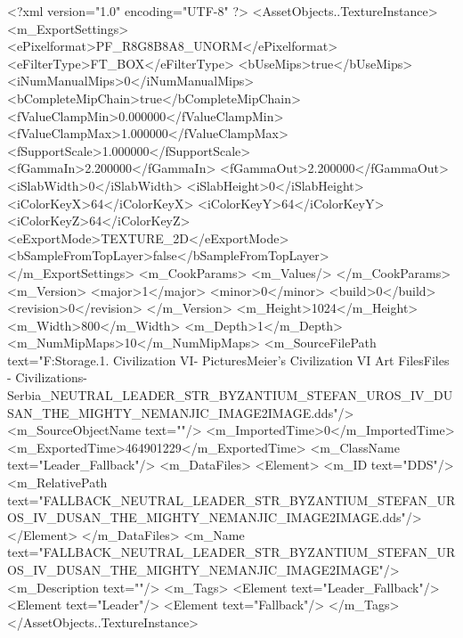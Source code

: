 <?xml version="1.0" encoding="UTF-8" ?>
<AssetObjects..TextureInstance>
	<m_ExportSettings>
		<ePixelformat>PF_R8G8B8A8_UNORM</ePixelformat>
		<eFilterType>FT_BOX</eFilterType>
		<bUseMips>true</bUseMips>
		<iNumManualMips>0</iNumManualMips>
		<bCompleteMipChain>true</bCompleteMipChain>
		<fValueClampMin>0.000000</fValueClampMin>
		<fValueClampMax>1.000000</fValueClampMax>
		<fSupportScale>1.000000</fSupportScale>
		<fGammaIn>2.200000</fGammaIn>
		<fGammaOut>2.200000</fGammaOut>
		<iSlabWidth>0</iSlabWidth>
		<iSlabHeight>0</iSlabHeight>
		<iColorKeyX>64</iColorKeyX>
		<iColorKeyY>64</iColorKeyY>
		<iColorKeyZ>64</iColorKeyZ>
		<eExportMode>TEXTURE_2D</eExportMode>
		<bSampleFromTopLayer>false</bSampleFromTopLayer>
	</m_ExportSettings>
	<m_CookParams>
		<m_Values/>
	</m_CookParams>
	<m_Version>
		<major>1</major>
		<minor>0</minor>
		<build>0</build>
		<revision>0</revision>
	</m_Version>
	<m_Height>1024</m_Height>
	<m_Width>800</m_Width>
	<m_Depth>1</m_Depth>
	<m_NumMipMaps>10</m_NumMipMaps>
	<m_SourceFilePath text="F:\Mod Storage\2.1. Civilization VI\Mods\Archive - Pictures\Sid Meier's Civilization VI Art Files\Art Files - Civilizations\Civilization - Serbia\FALLBACK_NEUTRAL_LEADER_STR_BYZANTIUM_STEFAN_UROS_IV_DUSAN_THE_MIGHTY_NEMANJIC_IMAGE2IMAGE.dds"/>
	<m_SourceObjectName text=""/>
	<m_ImportedTime>0</m_ImportedTime>
	<m_ExportedTime>464901229</m_ExportedTime>
	<m_ClassName text="Leader_Fallback"/>
	<m_DataFiles>
		<Element>
			<m_ID text="DDS"/>
			<m_RelativePath text="FALLBACK_NEUTRAL_LEADER_STR_BYZANTIUM_STEFAN_UROS_IV_DUSAN_THE_MIGHTY_NEMANJIC_IMAGE2IMAGE.dds"/>
		</Element>
	</m_DataFiles>
	<m_Name text="FALLBACK_NEUTRAL_LEADER_STR_BYZANTIUM_STEFAN_UROS_IV_DUSAN_THE_MIGHTY_NEMANJIC_IMAGE2IMAGE"/>
	<m_Description text=""/>
	<m_Tags>
		<Element text="Leader_Fallback"/>
		<Element text="Leader"/>
		<Element text="Fallback"/>
	</m_Tags>
</AssetObjects..TextureInstance>

